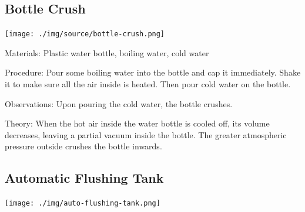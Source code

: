 \begin{multicols}{2}
\subsection{Bottle Crush}

\begin{center}
\texttt{[image: ./img/source/bottle-crush.png]}
\end{center}

\begin{description*}
\item[Materials:]{Plastic water bottle, boiling water, cold water}
\item[Procedure:]{Pour some boiling water into the bottle and cap it immediately. Shake it to make sure all the air inside is heated. Then pour cold water on the bottle.}
\item[Observations:]{Upon pouring the cold water, the bottle crushes.}
\item[Theory:]{When the hot air inside the water bottle is cooled off, its volume decreases, leaving a partial vacuum inside the bottle. The greater atmospheric pressure outside crushes the bottle inwards.}
\end{description*}

\subsection{Automatic Flushing Tank}
\label{sub:auto-tank}

\begin{center}
\texttt{[image: ./img/auto-flushing-tank.png]}
\end{center}


\end{multicols}
